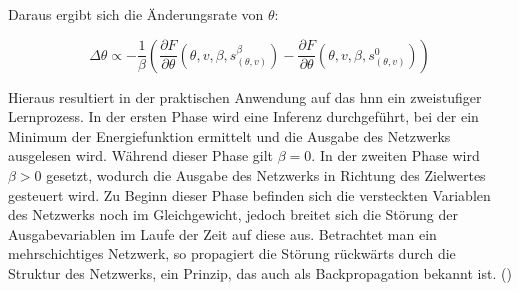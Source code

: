Daraus ergibt sich die Änderungsrate von \(\theta\):

\[\Delta\theta\propto -\frac{1}{\beta}\left(\frac{\partial F}{\partial \theta}(\theta,v,\beta,s_{(\theta,v)}^\beta)-\frac{\partial F}{\partial \theta}(\theta,v,\beta,s_{(\theta,v)}^0)\right)\]

Hieraus resultiert in der praktischen Anwendung auf das \ac{hnn} ein zweistufiger Lernprozess. In der ersten Phase wird eine Inferenz durchgeführt, bei der ein Minimum der Energiefunktion ermittelt und die Ausgabe des Netzwerks ausgelesen wird. Während dieser Phase gilt \(\beta=0\). In der zweiten Phase wird \(\beta>0\) gesetzt, wodurch die Ausgabe des Netzwerks in Richtung des Zielwertes gesteuert wird. Zu Beginn dieser Phase befinden sich die versteckten Variablen des Netzwerks noch im Gleichgewicht, jedoch breitet sich die Störung der Ausgabevariablen im Laufe der Zeit auf diese aus. Betrachtet man ein mehrschichtiges Netzwerk, so propagiert die Störung rückwärts durch die Struktur des Netzwerks, ein Prinzip, das auch als Backpropagation bekannt ist. (\cite{Scellier2017})
